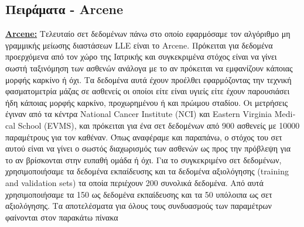 \subsection{Πειράματα - \textlatin{Arcene}}
\par
\href{http://archive.ics.uci.edu/ml/datasets/Arcene}{\textbf{\textlatin{Arcene:}}\textlatin{\cite{15}}} Τελευταίο σετ δεδομένων πάνω στο οποίο εφαρμόσαμε τον αλγόριθμο μη γραμμικής μείωσης διαστάσεων \textlatin{LLE} είναι το \textlatin{Arcene}\textlatin{\cite{15}}. Πρόκειται για δεδομένα προερχόμενα από τον χώρο της Ιατρικής και συγκεκριμένα στόχος είναι να γίνει σωστή ταξινόμηση των ασθενών ανάλογα με το αν πρόκειται να εμφανίζουν κάποιας μορφής καρκίνο ή όχι. Τα δεδομένα αυτά έχουν προέλθει εφαρμόζοντας την τεχνική φασματομετρία μάζας σε ασθενείς οι οποίοι είτε είναι υγιείς είτε έχουν παρουσιάσει ήδη κάποιας μορφής καρκίνο, προχωρημένου ή και πρώιμου σταδίου. Οι μετρήσεις έγιναν από τα κέντρα \textlatin{National Cancer Institute (NCI)} και \textlatin{ Eastern Virginia Medical School (EVMS)}, και πρόκειται για ένα σετ δεδομένων από 900 ασθενείς με 10000 παραμέτρους για τον καθέναν. Όπως αναφέραμε και παραπάνω, ο στόχος του σετ αυτού είναι να γίνει ο σωστός διαχωρισμός των ασθενών ως προς την πρόβλεψη για το αν βρίσκονται στην ευπαθή ομάδα ή όχι. Για το συγκεκριμένο σετ δεδομένων, χρησιμοποιήσαμε τα δεδομένα εκπαίδευσης και τα δεδομένα αξιολόγησης (\textlatin{training and validation sets}) τα οποία περιέχουν 200 συνολικά δεδομένα. Από αυτά χρησιμοποιήσαμε τα 150 ως δεδομένα εκπαίδευσης και τα 50 υπόλοιπα ως σετ αξιολόγησης. Τα αποτελέσματα για όλους τους συνδυασμούς των παραμέτρων φαίνονται στον παρακάτω πίνακα

